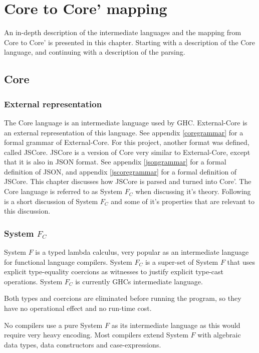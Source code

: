 
\chapter{Core to Core' mapping}
\label{chap:rewrite}

An in-depth description of the intermediate languages and the mapping from
Core to Core' is presented in this chapter. 
Starting with a description of the Core language, and continuing with a 
description of the parsing. 

\section{Core}

\subsection*{External representation}

The Core language is an intermediate language used by GHC. External-Core
is an external representation of this language. See appendix 
\ref{coregrammar} for a formal grammar of External-Core. For this project,
another format was defined, called JSCore. JSCore is a version of Core
very similar to External-Core, except that it is also in JSON format. 
See appendix \ref{jsongrammar} for a formal definition of JSON, and 
appendix \ref{jscoregrammar} for a formal definition of JSCore. This
chapter discusses how JSCore is parsed and turned into Core'. The Core
language is referred to as System $F_C$ when discussing it's theory.
Following is a short discussion of System $F_C$ and some of it's 
properties that are relevant to this discussion.

\subsection*{System $F_C$}

System $F$ is a typed lambda calculus, very popular as an intermediate language
for functional language compilers. System $F_C$ is a super-set of System $F$ 
that uses explicit type-equality coercions as witnesses to justify explicit
type-cast operations. System $F_C$ is currently GHCs intermediate language.
\cite{sulzmann2007system}

Both types and coercions are eliminated before running the program, so they have
no operational effect and no run-time cost.
\cite{sulzmann2007system}

No compilers use a pure System $F$ as its intermediate language as this would
require very heavy encoding. Most compilers extend System $F$ with algebraic
data types, data constructors and case-expressions.
\cite{sulzmann2007system}

